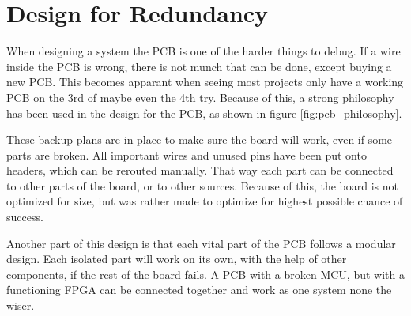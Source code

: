 \documentclass[../main/report.tex]{subfiles}
\begin{document}
\section{Design for Redundancy}

When designing a system the PCB is one of the harder things to debug.
If a wire inside the PCB is wrong, there is not munch that can be done, except buying a new PCB.
This becomes apparant when seeing most projects only have a working PCB on the 3rd of maybe even the 4th try. 
Because of this, a strong philosophy has been used in the design for the PCB, as shown in figure \ref{fig:pcb_philosophy}.

These backup plans are in place to make sure the board will work, even if some parts are broken.
All important wires and unused pins have been put onto headers, which can be rerouted manually.
That way each part can be connected to other parts of the board, or to other sources.
Because of this, the board is not optimized for size, but was rather made to optimize for highest possible chance of success.

Another part of this design is that each vital part of the PCB follows a modular design.
Each isolated part will work on its own, with the help of other components, if the rest of the board fails.
A PCB with a broken MCU, but with a functioning FPGA can be connected together and work as one system none the wiser.
\end{document}
